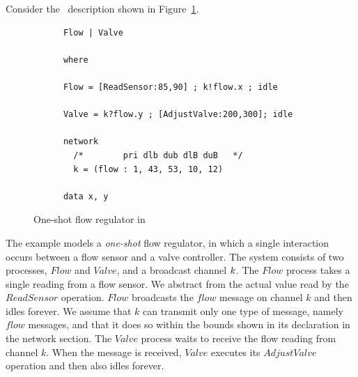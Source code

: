Consider the \bcandle\ description shown in Figure~\ref{fig:tgflowoneshot}.
\begin{figure}
\begin{center}
\small
\begin{verbatim}
      Flow | Valve

      where

      Flow = [ReadSensor:85,90] ; k!flow.x ; idle 

      Valve = k?flow.y ; [AdjustValve:200,300]; idle 

      network
        /*        pri dlb dub dlB duB   */
        k = (flow : 1, 43, 53, 10, 12)

      data x, y
\end{verbatim}
\end{center}
\caption{One-shot flow regulator in \bcandle\label{fig:tgflowoneshot}}
\end{figure}
The example models a \emph{one-shot} flow regulator, in which a single 
interaction occurs between a flow sensor and
a valve controller. The system consists of two processes, $Flow$
and $Valve$, and a broadcast channel ${k}$. The $Flow$ process
takes a single reading from a flow sensor. We abstract from the
actual value read by the $ReadSensor$ operation. $Flow$ broadcasts
the $flow$ message on channel $k$ and then idles forever. We
assume that $k$ can transmit only one type of message, namely
$flow$ messages, and that it does so within the bounds shown in
its declaration in the network section. The $Valve$ process waits to
receive the flow reading from channel $k$. When the message is
received, $Valve$ executes its $AdjustValve$ operation and then also
idles forever.

